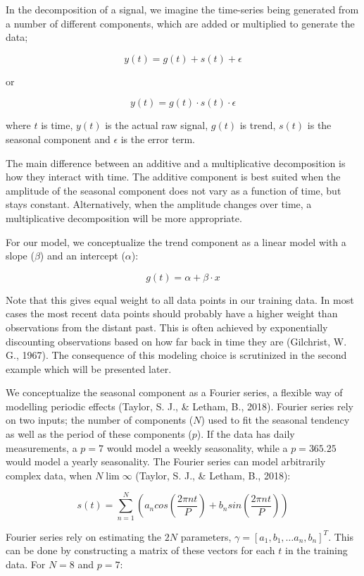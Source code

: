 \documentclass{article}
\begin{document}
In the decomposition of a signal, we imagine the time-series being generated from a number of different components, which are added or multiplied to generate the data;


$$y(t) = g(t) + s(t) + \epsilon$$

\begin{center}
    or
\end{center}

$$y(t) = g(t) \cdot s(t) \cdot \epsilon $$

where $t$ is time, $y(t)$ is the actual raw signal, $g(t)$ is trend, $s(t)$ is the seasonal component and $\epsilon$ is the error term. 

The main difference between an additive and a multiplicative decomposition is how they interact with time. The additive component is best suited when the amplitude of the seasonal component does not vary as a function of time, but stays constant. Alternatively, when the amplitude changes over time, a multiplicative decomposition will be more appropriate. 

For our model, we conceptualize the trend component as a linear model with a slope ($\beta$) and an intercept ($\alpha$):

$$g(t) = \alpha + \beta \cdot x$$

Note that this gives equal weight to all data points in our training data. In most cases the most recent data points should probably have a higher weight than observations from the distant past. This is often achieved by exponentially discounting observations based on how far back in time they are (Gilchrist, W. G., 1967). The consequence of this modeling choice is scrutinized in the second example which will be presented later.

We conceptualize the seasonal component as a Fourier series, a flexible way of modelling periodic effects (Taylor, S. J., \& Letham, B., 2018). Fourier series rely on two inputs; the number of components ($N$) used to fit the seasonal tendency as well as the period of these components ($p$). If the data has daily measurements, a $p = 7$ would model a weekly seasonality, while a $p = 365.25$ would model a yearly seasonality. The Fourier series can model arbitrarily complex data, when $N \lim \infty$ (Taylor, S. J., \& Letham, B., 2018):

$$s(t) = \sum _{n=1} ^N \left( a_n cos(\frac{2 \pi n t}{P}) + b_n sin(\frac{2 \pi n t}{P}) \right)$$

Fourier series rely on estimating the $2N$ parameters, $\gamma = [a_1, b_1, … a_n, b_n]^T$. This can be done by constructing a matrix of these vectors for each $t$ in the training data. For $N = 8$ and $p = 7$:
\end{document}
